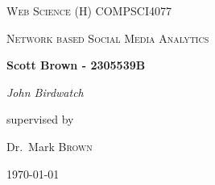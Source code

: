 \documentclass[10pt,a4paper]{article}
\begin{document}
\begin{titlepage}
	\centering
	{\scshape\LARGE Web Science (H) COMPSCI4077 \par}
	\vspace{1cm}
	{\scshape\Large Network based Social Media Analytics\par}
	\vspace{1.5cm}
	{\huge\bfseries Scott Brown - 2305539B \par}
	\vspace{2cm}
	{\Large\itshape John Birdwatch\par}
	\vfill
	supervised by\par
	Dr.~Mark \textsc{Brown}

	\vfill

	{\large \today\par}
	
\end{titlepage}
\end{document}
